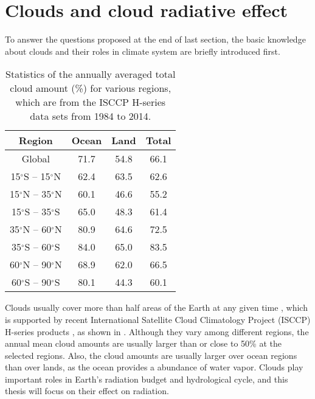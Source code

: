 
\section{Clouds and cloud radiative effect}

To answer the questions proposed at the end of last section, the basic knowledge about clouds and their roles in climate system are briefly introduced first.

\begin{table}[htp]
\centering
\small %
\caption{Statistics of the annually averaged total cloud amount (\%) for various regions, which are from the ISCCP H-series data sets \citep{Young2018} from 1984 to 2014.}
\vspace{0.5em}
\begin{tabular}{cccc}
	\toprule
	Region & Ocean & Land &  Total\\
	\midrule
	Global & 71.7 & 54.8 & 66.1 \\
	15$^\circ$S -- 15$^\circ$N &  62.4&  63.5& 62.6 \\
	15$^\circ$N -- 35$^\circ$N &  60.1&  46.6& 55.2 \\
	15$^\circ$S -- 35$^\circ$S &  65.0&  48.3& 61.4 \\
	35$^\circ$N -- 60$^\circ$N &  80.9&  64.6& 72.5 \\
	35$^\circ$S -- 60$^\circ$S &  84.0&  65.0& 83.5 \\
	60$^\circ$N -- 90$^\circ$N &  68.9&  62.0& 66.5 \\
	60$^\circ$S -- 90$^\circ$S &  80.1&  44.3& 60.1 \\
	\bottomrule
\end{tabular}
\label{tab:statistics_cld_amt}
\end{table}

Clouds usually cover more than half areas of the Earth at any given time \citep{Houze2014,Ramanathan1989}, which is supported by recent International Satellite Cloud Climatology Project (ISCCP) H-series products \citep{Young2018}, as shown in . Although they vary among different regions, the annual mean cloud amounts are usually larger than or close to 50\% at the selected regions. Also, the cloud amounts are usually larger over ocean regions than over lands, as the ocean provides a abundance of water vapor. Clouds play important roles in Earth's radiation budget and hydrological cycle, and this thesis will focus on their effect on radiation.

